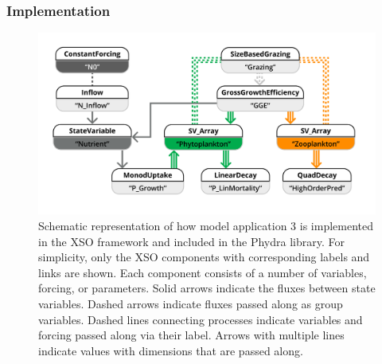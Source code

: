\documentclass[journal abbreviation, manuscript]{copernicus}
\begin{document}
\subsubsection{Implementation}
\begin{figure}[t]
\includegraphics[width=15cm]{Figures/firstdraft_schematics/code_schematics/ASTroCAT.pdf}
\caption{Schematic representation of how model application 3 is implemented in the XSO framework and included in the Phydra library. For simplicity, only the XSO components with corresponding labels and links are shown. Each component consists of a number of variables, forcing, or parameters. Solid arrows indicate the fluxes between state variables. Dashed arrows indicate fluxes passed along as group variables. Dashed lines connecting processes indicate variables and forcing passed along via their label. Arrows with multiple lines indicate values with dimensions that are passed along.}
\label{Figure:CodeSchematics_3}
\end{figure}
\end{document}
